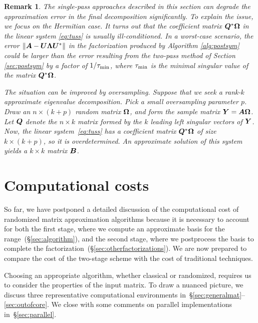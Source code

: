 \documentclass[final]{siamltex}
\newcounter{algorithm}[section]
\newtheorem{remark}{Remark}[section]
\begin{document}
\begin{remark} \rm
The single-pass approaches described in this
section can degrade the approximation error
in the final decomposition significantly.
To explain the issue, we focus on
the Hermitian case.  It turns out that the coefficient matrix
$\bm{Q}^{*}\bm{\Omega}$ in the linear
system \eqref{eq:tuss} is usually ill-conditioned.
In a worst-case scenario, the error
$\left\Vert {\bm{A} - \bm{U}\bm{\Lambda}\bm{U}^{*}} \right\Vert$
in the factorization produced by Algorithm \ref{alg:postsym}
could be larger than the error resulting from the two-pass
method of Section \ref{sec:postsym} by a
factor of $1/\tau_{\rm min}$, where $\tau_{\rm min}$ is the
minimal singular value of the matrix $\bm{Q}^{*}\bm{\Omega}$.

The situation can be improved by oversampling.  Suppose that
we seek a rank-$k$ approximate eigenvalue decomposition.
Pick a small oversampling parameter $p$.  Draw
an $n\times (k+p)$ random matrix $\bm{\Omega}$,
and form the sample matrix $\bm{Y} = \bm{A}\bm{\Omega}$.
Let $\bm{Q}$ denote the $n\times k$ matrix formed by
the $k$ leading left singular vectors
of $\bm{Y}$. Now, the linear system~\eqref{eq:tuss} has a coefficient matrix $\bm{Q}^{*}\bm{\Omega}$
of size $k \times (k+p)$, so it is overdetermined.  An
approximate solution of this system yields a $k \times k$
matrix $\bm{B}$.
\end{remark}

\lsp


\section{Computational costs}
\label{sec:costs}
%
So far, we have postponed a detailed discussion of the computational
cost of randomized matrix approximation algorithms because it is necessary
to account for both the first stage, where we compute an approximate basis for
the range~(\S\ref{sec:algorithm}), and the second stage, where we postprocess
the basis to complete the factorization~(\S\ref{sec:otherfactorizations}).
We are now prepared to compare the cost of the two-stage scheme with the cost of
traditional techniques.

Choosing an appropriate algorithm, whether classical or randomized,
requires us to consider the properties of the input matrix.
To draw a nuanced picture, we discuss three
representative computational environments
in~\S\ref{sec:generalmat}--\ref{sec:outofcore}.
We close with some comments on parallel implementations in~\S\ref{sec:parallel}.
\end{document}
